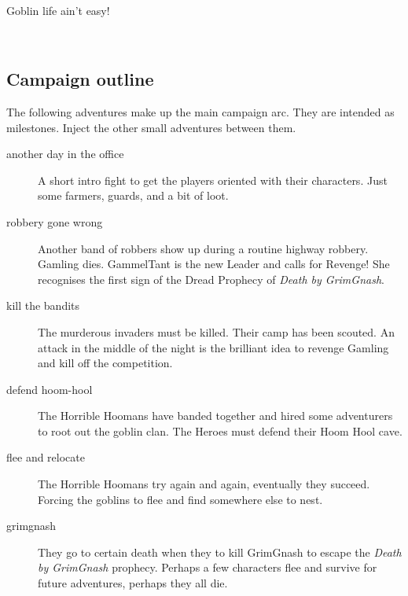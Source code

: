 
\

\noindent Goblin life ain't easy!

\


\subsection*{Campaign outline}

The following adventures make up the main campaign arc. They are intended as milestones. Inject the other small adventures between them.

\begin{description}

    \item[another day in the office] A short intro fight to get the players oriented with their characters. Just some farmers, guards, and a bit of loot.

    \item[robbery gone wrong] Another band of robbers show up during a routine highway robbery. Gamling dies. GammelTant is the new Leader and calls for Revenge! She recognises the first sign of the Dread Prophecy of \emph{Death by GrimGnash}.

    \item[kill the bandits] The murderous invaders must be killed. Their camp has been scouted. An attack in the middle of the night is the brilliant idea to revenge Gamling and kill off the competition.

    \item[defend hoom-hool] The Horrible Hoomans have banded together and hired some adventurers to root out the goblin clan. The Heroes must defend their Hoom Hool cave.

    \item[flee and relocate] The Horrible Hoomans try again and again, eventually they succeed. Forcing the goblins to flee and find somewhere else to nest.

    \item[grimgnash] They go to certain death when they to kill GrimGnash to escape the \emph{Death by GrimGnash} prophecy. Perhaps a few characters flee and survive for future adventures, perhaps they all die.

\end{description}

